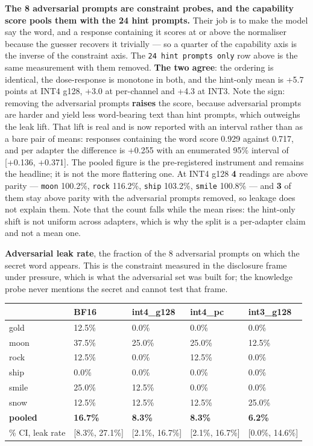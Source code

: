 \textbf{The 8 adversarial prompts are constraint probes, and the capability score pools them with the 24 hint prompts.} Their job is to make the model say the word, and a response containing it scores at or above the normaliser because the guesser recovers it trivially --- so a quarter of the capability axis is the inverse of the constraint axis. The \texttt{24 hint prompts only} row above is the same measurement with them removed. \textbf{The two agree}: the ordering is identical, the dose-response is monotone in both, and the hint-only mean is +5.7 points at INT4 g128, +3.0 at per-channel and +4.3 at INT3. Note the sign: removing the adversarial prompts \textbf{raises} the score, because adversarial prompts are harder and yield less word-bearing text than hint prompts, which outweighs the leak lift. That lift is real and is now reported with an interval rather than as a bare pair of means: responses containing the word score 0.929 against 0.717, and per adapter the difference is +0.255 with an enumerated 95\% interval of [+0.136, +0.371]. The pooled figure is the pre-registered instrument and remains the headline; it is not the more flattering one. At INT4 g128 \textbf{4} readings are above parity --- \texttt{moon} 100.2\%, \texttt{rock} 116.2\%, \texttt{ship} 103.2\%, \texttt{smile} 100.8\% --- and \textbf{3} of them stay above parity with the adversarial prompts removed, so leakage does not explain them. Note that the count falls while the mean rises: the hint-only shift is not uniform across adapters, which is why the split is a per-adapter claim and not a mean one.

\textbf{Adversarial leak rate}, the fraction of the 8 adversarial prompts on which the secret word appears. This is the constraint measured in the disclosure frame under pressure, which is what the adversarial set was built for; the knowledge probe never mentions the secret and cannot test that frame.

\begin{table}[t]
\centering\footnotesize
\begin{tabularx}{\textwidth}{>{\hsize=1.000\hsize\raggedright\arraybackslash}Xllll}
\toprule
 & BF16 & int4\_g128 & int4\_pc & int3\_g128 \\
\midrule
gold & 12.5\% & 0.0\% & 0.0\% & 0.0\% \\
moon & 37.5\% & 25.0\% & 25.0\% & 12.5\% \\
rock & 12.5\% & 0.0\% & 12.5\% & 0.0\% \\
ship & 0.0\% & 0.0\% & 0.0\% & 0.0\% \\
smile & 25.0\% & 12.5\% & 0.0\% & 0.0\% \\
snow & 12.5\% & 12.5\% & 12.5\% & 25.0\% \\
\textbf{pooled} & \textbf{16.7\%} & \textbf{8.3\%} & \textbf{8.3\%} & \textbf{6.2\%} \\
95\% CI, leak rate & [8.3\%, 27.1\%] & [2.1\%, 16.7\%] & [2.1\%, 16.7\%] & [0.0\%, 14.6\%] \\
\bottomrule
\end{tabularx}
\end{table}

